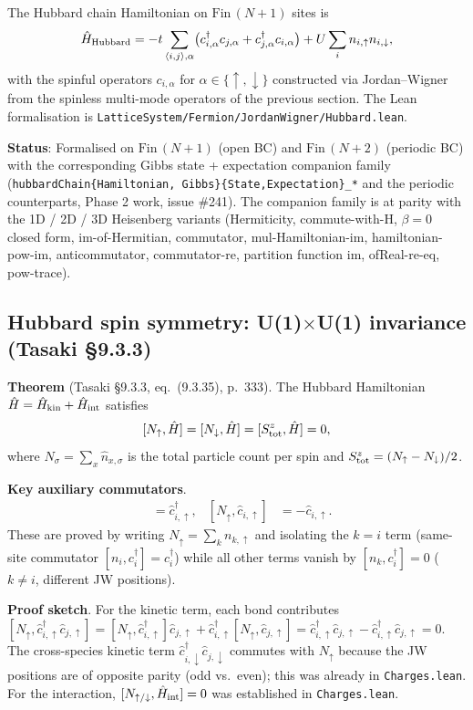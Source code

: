 \documentclass[a4paper,11pt]{article}
\begin{document}
The Hubbard chain Hamiltonian on \(\mathrm{Fin}\,(N+1)\) sites is
\[
  \hat H_{\rm Hubbard}
    = -t \sum_{\langle i, j\rangle, \alpha}
        \bigl(c_{i,\alpha}^\dagger c_{j,\alpha}
              + c_{j,\alpha}^\dagger c_{i,\alpha}\bigr)
      + U \sum_i n_{i,\uparrow} n_{i,\downarrow},
\]
with the spinful operators
\(c_{i,\alpha}\) for \(\alpha \in \{\uparrow,\downarrow\}\)
constructed via Jordan--Wigner from the spinless multi-mode
operators of the previous section.  The Lean formalisation is
\texttt{LatticeSystem/Fermion/JordanWigner/Hubbard.lean}.

\textbf{Status}: Formalised on
\(\mathrm{Fin}\,(N+1)\) (open BC) and \(\mathrm{Fin}\,(N+2)\)
(periodic BC) with the corresponding Gibbs state +
expectation companion family
(\texttt{hubbardChain\{Hamiltonian, Gibbs\}\{State,Expectation\}\_*}
and the periodic counterparts, Phase 2 work, issue \#241).
The companion family is at parity with the 1D / 2D / 3D
Heisenberg variants (Hermiticity, commute-with-H, $\beta = 0$
closed form, im-of-Hermitian, commutator, mul-Hamiltonian-im,
hamiltonian-pow-im, anticommutator, commutator-re,
partition function im, ofReal-re-eq, pow-trace).

\subsection{Hubbard spin symmetry: U(1)\texorpdfstring{$\times$}{×}U(1) invariance (Tasaki §9.3.3)}
\label{subsec:hubbard-spin-symmetry}

\noindent\textbf{Theorem} (Tasaki §9.3.3, eq.~(9.3.35), p.~333).
The Hubbard Hamiltonian $\hat H = \hat H_{\rm kin} + \hat H_{\rm int}$
satisfies
\[
  [N_\uparrow, \hat H] = [N_\downarrow, \hat H] = [S^z_{\rm tot}, \hat H] = 0,
\]
where $N_\sigma = \sum_x \hat n_{x,\sigma}$ is the total particle count
per spin and $S^z_{\rm tot} = (N_\uparrow - N_\downarrow)/2$.

\noindent\textbf{Key auxiliary commutators}.
\begin{align*}
  [N_\uparrow, \hat c^\dagger_{i,\uparrow}] &= \hat c^\dagger_{i,\uparrow}, &
  [N_\uparrow, \hat c_{i,\uparrow}] &= -\hat c_{i,\uparrow}.
\end{align*}
These are proved by writing $N_\uparrow = \sum_k n_{k,\uparrow}$ and
isolating the $k = i$ term (same-site commutator $[n_i, c^\dagger_i] = c^\dagger_i$)
while all other terms vanish by
$[n_k, c^\dagger_i] = 0$ ($k \neq i$, different JW positions).

\noindent\textbf{Proof sketch}.
For the kinetic term, each bond contributes
$[N_\uparrow, \hat c^\dagger_{i,\uparrow}\hat c_{j,\uparrow}] =
 [N_\uparrow,\hat c^\dagger_{i,\uparrow}]\hat c_{j,\uparrow} +
 \hat c^\dagger_{i,\uparrow}[N_\uparrow,\hat c_{j,\uparrow}] =
 \hat c^\dagger_{i,\uparrow}\hat c_{j,\uparrow} -
 \hat c^\dagger_{i,\uparrow}\hat c_{j,\uparrow} = 0$.
The cross-species kinetic term $\hat c^\dagger_{i,\downarrow}\hat c_{j,\downarrow}$
commutes with $N_\uparrow$ because the JW positions are of opposite parity
(odd vs.\ even); this was already in \texttt{Charges.lean}.
For the interaction, $[N_{\uparrow/\downarrow}, \hat H_{\rm int}] = 0$
was established in \texttt{Charges.lean}.
\end{document}
